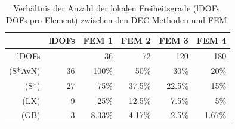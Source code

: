   \begin{table}[htbp]
    \centering
    \begin{tabular}{|r|r|r|r|r|r|}
      \hline
       & lDOFs & FEM 1 & FEM 2 & FEM 3 & FEM 4 \\\hline
       lDOFs & & 36 & 72 & 120 & 180 \\\hline
       (S*AvN) & 36 & 100\% & 50\%   & 30\%   & 20\%  \\\hline
       (S*)    & 27 & 75\%  & 37.5\% & 22.5\% & 15\% \\\hline
       (LX)    & 9  & 25\%  & 12.5\% & 7.5\%  & 5\% \\\hline
       (GB)    & 3  & 8.33\% & 4.17\% & 2.5\% & 1.67\% \\\hline
    \end{tabular}
    \caption[lDOFs Vergleich]{Verhältnis der Anzahl der lokalen Freiheitsgrade (lDOFs, DOFs pro Element) zwischen den DEC-Methoden und FEM.}
    \label{tabDOFsVergleich}
  \end{table}
  
